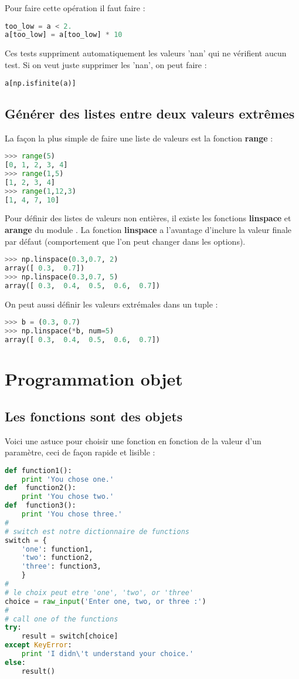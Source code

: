 \documentclass[a4paper,twoside]{article}
\begin{document}
Pour faire cette opération il faut faire :
\begin{lstlisting}[language=python]
too_low = a < 2.
a[too_low] = a[too_low] * 10
\end{lstlisting}

\bigskip

Ces tests suppriment automatiquement les valeurs 'nan' qui ne vérifient aucun test. Si on veut juste supprimer les 'nan', on peut faire :
\begin{lstlisting}[language=python]
a[np.isfinite(a)]
\end{lstlisting}

\subsection{Générer des listes entre deux valeurs extrêmes}
La façon la plus simple de faire une liste de valeurs est la fonction \textbf{range} : 
\begin{lstlisting}[language=python]
>>> range(5)
[0, 1, 2, 3, 4]
>>> range(1,5)
[1, 2, 3, 4]
>>> range(1,12,3)
[1, 4, 7, 10]
\end{lstlisting}

Pour définir des listes de valeurs non entières, il existe les fonctions \textbf{linspace} et \textbf{arange} du module . La fonction \textbf{linspace} a l'avantage d'inclure la valeur finale par défaut (comportement que l'on peut changer dans les options).

\begin{lstlisting}[language=python]
>>> np.linspace(0.3,0.7, 2)
array([ 0.3,  0.7])
>>> np.linspace(0.3,0.7, 5)
array([ 0.3,  0.4,  0.5,  0.6,  0.7])
\end{lstlisting}

On peut aussi définir les valeurs extrémales dans un tuple : 
\begin{lstlisting}[language=python]
>>> b = (0.3, 0.7)
>>> np.linspace(*b, num=5)
array([ 0.3,  0.4,  0.5,  0.6,  0.7])
\end{lstlisting}

\section{Programmation objet}
\subsection{Les fonctions sont des objets}
Voici une astuce pour choisir une fonction en fonction de la valeur d'un paramètre, ceci de façon rapide et lisible :
\begin{lstlisting}[language=python]
def function1():
    print 'You chose one.'
def  function2():
    print 'You chose two.'
def  function3():
    print 'You chose three.'
#
# switch est notre dictionnaire de functions
switch = {
    'one': function1,
    'two': function2,
    'three': function3,
    }
#
# le choix peut etre 'one', 'two', or 'three'
choice = raw_input('Enter one, two, or three :')
#
# call one of the functions
try:
    result = switch[choice]
except KeyError:
    print 'I didn\'t understand your choice.'
else:
    result()
\end{lstlisting}
\end{document}
